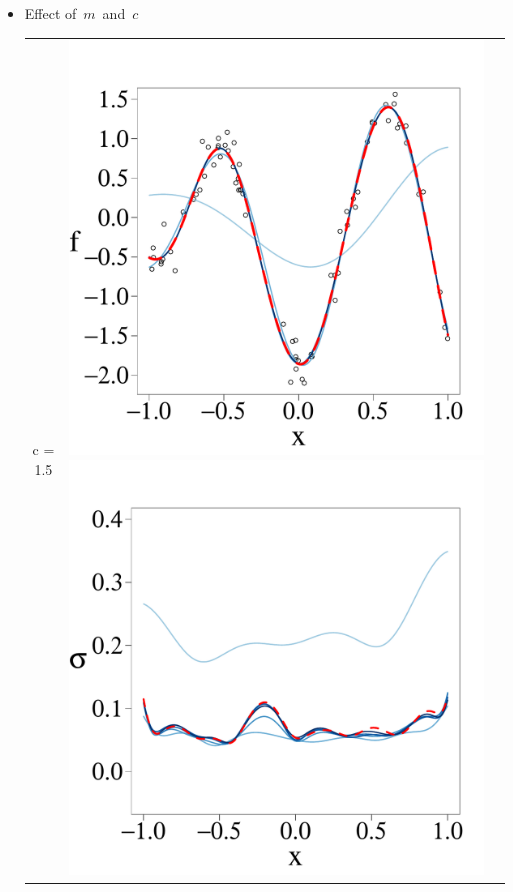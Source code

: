 \documentclass[8pt]{beamer} %
\begin{document}
\begin{frame}
 
\begin{itemize}\setlength\itemsep{2mm}
\item \normalsize Effect of\, $m$\, and\, $c$\\[3mm]
\begin{adjustwidth}{-4.3em}{-3em}
%
\centering
\begin{tabular}{ c c c }
\arrayrulecolor{gray!50}\hline
c = 1.5 &
\includegraphics[scale=0.17, trim = 0mm 14mm 0mm 14mm, clip]{ch5_fig3_Post_part4.pdf} 
\includegraphics[scale=0.17, trim = 0mm 14mm 0mm 14mm, clip]{ch5_fig3_Sigma_part4.pdf} 

\end{tabular}
\end{adjustwidth}
\end{itemize}
\end{frame}
\end{document}
